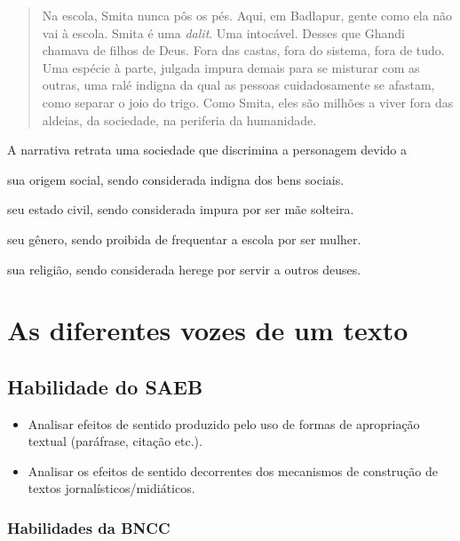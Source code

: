 \begin{quote}
Na escola, Smita nunca pôs os pés. Aqui, em Badlapur, gente como ela não
vai à escola. Smita é uma \emph{dalit}. Uma intocável. Desses que Ghandi
chamava de filhos de Deus. Fora das castas, fora do sistema, fora de
tudo. Uma espécie à parte, julgada impura demais para se misturar com as
outras, uma ralé indigna da qual as pessoas cuidadosamente se afastam,
como separar o joio do trigo. Como Smita, eles são milhões a viver fora
das aldeias, da sociedade, na periferia da humanidade.
\end{quote}


A narrativa retrata uma sociedade que discrimina a personagem devido a

\begin{escolha}
\item sua origem social, sendo considerada indigna dos bens sociais.

\item seu estado civil, sendo considerada impura por ser mãe solteira.

\item seu gênero, sendo proibida de frequentar a escola por ser mulher.

\item sua religião, sendo considerada herege por servir a outros deuses.
\end{escolha}

\chapter{As diferentes vozes de um texto}

\section{Habilidade do SAEB}

\begin{itemize}
\item Analisar efeitos de sentido produzido
pelo uso de formas de apropriação textual (paráfrase, citação etc.).
\item Analisar os efeitos de sentido decorrentes dos mecanismos de construção
de textos jornalísticos/midiáticos.
\end{itemize}

\subsection{Habilidades da BNCC}

